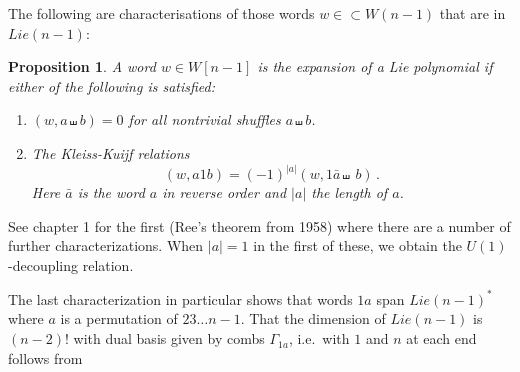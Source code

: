 \documentclass[11pt]{article}
\newcommand{\1}{{\rm 1\hskip-0.25em I}}
\newtheorem{propn}{Proposition}[section]
\begin{document}
The following are characterisations of those words   $w\in\subset W(n-1)$ that are in  $Lie(n-1)$:
\begin{propn}\label{Lie-char}
A word $w\in W[n-1]$ is the expansion of a Lie polynomial if either of the following is satisfied:
\begin{enumerate}
\item $(w,a\shuffle b)=0$ for all nontrivial shuffles $a\shuffle b$.
\item The Kleiss-Kuijf relations  \cite{KK1989} 
\begin{equation}
(w, a1b)=(-1)^{|a|}(w,1\bar a\shuffle \ b)\, .
\end{equation}
Here $\bar a$ is the word $a$ in reverse order and $|a|$ the length of $a$.
\end{enumerate}

\end{propn}

See \cite{Reutenauer} chapter 1 for the first (Ree's theorem from 1958) where there are a number of further characterizations.
When $|a|=1$ in the first of these, we obtain the $U(1)$-decoupling relation.

  The last characterization in particular shows that  words $1a$ span $Lie(n-1)^*$ where $a$ is a permutation of $23\ldots n-1$. That the dimension of  $Lie(n-1)$ is $(n-2)!$ with  dual basis given by combs $\Gamma_{1a}$, i.e.\ with $1$ and $n$ at each end follows from
  
\end{document}
